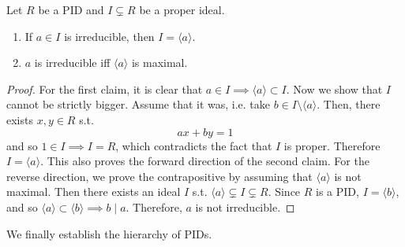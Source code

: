   \begin{corollary}
    \label{thm:irreducible-maximal}
    Let $R$ be a PID and $I \subsetneq R$ be a proper ideal. 
    \begin{enumerate}
      \item If $a \in I$ is irreducible, then $I = \langle a \rangle$.
      \item $a$ is irreducible iff $\langle a \rangle$ is maximal. 
    \end{enumerate}
  \end{corollary}
  \begin{proof}
    For the first claim, it is clear that $a \in I \implies \langle a \rangle \subset I$. Now we show that $I$ cannot be strictly bigger. Assume that it was, i.e. take $b \in I \setminus \langle a \rangle$. Then, there exists $x, y \in R$ s.t. 
      \begin{equation}
        ax + by = 1
      \end{equation}
    and so $1 \in I \implies I = R$, which contradicts the fact that $I$ is proper. Therefore $I = \langle a \rangle$. This also proves the forward direction of the second claim. For the reverse direction, we prove the contrapositive by assuming that $\langle a \rangle$ is not maximal. Then there exists an ideal $I$ s.t. $\langle a \rangle \subsetneq I \subsetneq R$. Since $R$ is a PID, $I = \langle b \rangle$, and so $\langle a \rangle \subset \langle b \rangle \implies b \mid a$. Therefore, $a$ is not irreducible. 
  \end{proof}

  We finally establish the hierarchy of PIDs. 

